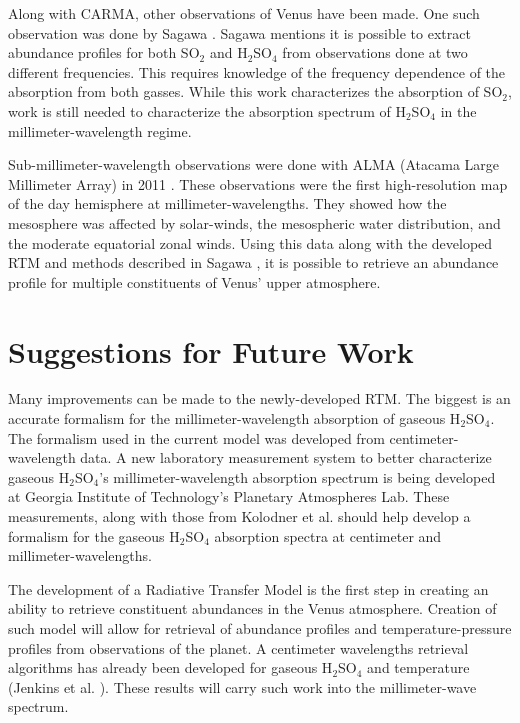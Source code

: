Along with CARMA, other observations of Venus have been made. One such observation was done by Sagawa \cite{Sagawa-2008}. Sagawa mentions it is possible to extract abundance profiles for both SO$_2$ and H$_2$SO$_4$ from observations done at two different frequencies. This requires knowledge of the frequency dependence of the absorption from both gasses. While this work characterizes the absorption of SO$_2$, work is still needed to characterize the absorption spectrum of H$_2$SO$_4$ in the millimeter-wavelength regime. 

Sub-millimeter-wavelength observations were done with ALMA (Atacama Large Millimeter Array) in 2011 \cite{ALMA-2013}. These observations were the first high-resolution map of the day hemisphere at millimeter-wavelengths. They showed how the mesosphere was affected by solar-winds, the mesospheric water distribution, and the moderate equatorial zonal winds. Using this data along with the developed RTM and methods described in Sagawa \cite{Sagawa-2008}, it is possible to retrieve an abundance profile for multiple constituents of Venus' upper atmosphere.

\section{Suggestions for Future Work}
Many improvements can be made to the newly-developed RTM. The biggest is an accurate formalism for the millimeter-wavelength absorption of gaseous H$_2$SO$_4$. The formalism used in the current model was developed from centimeter-wavelength data. A new laboratory measurement system to better characterize gaseous H$_2$SO$_4$'s millimeter-wavelength absorption spectrum is being developed at Georgia Institute of Technology's Planetary Atmospheres Lab. These measurements, along with those from Kolodner et al. \cite{Kolodner-1998} should help develop a formalism for the gaseous H$_2$SO$_4$ absorption spectra at centimeter and millimeter-wavelengths. 

The development of a Radiative Transfer Model is the first step in creating an ability to retrieve constituent abundances in the Venus atmosphere. Creation of such model will allow for retrieval of abundance profiles and temperature-pressure profiles from observations of the planet. A centimeter wavelengths retrieval algorithms has already been developed for gaseous H$_2$SO$_4$ and temperature (Jenkins et al. \cite{Jenkins-2002}). These results will carry such work into the millimeter-wave spectrum.